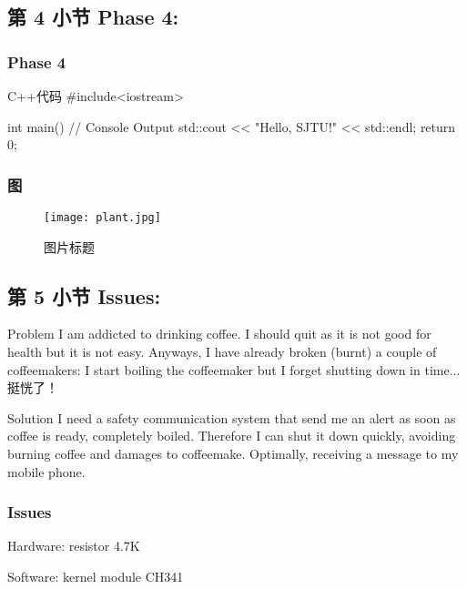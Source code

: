 \documentclass[
    aspectratio=169,                   %
]{beamer}
\begin{document}
\subsection{第 4 小节 Phase 4: }

    \begin{frame}[fragile]          %
        \frametitle{Phase 4}
        \begin{codeblock}[language=c++]{C++代码}
#include<iostream>

int main(){
    // Console Output
    std::cout << "Hello, SJTU!" << std::endl;
    return 0;
}
        \end{codeblock}
    \end{frame}

    \begin{frame}
        \frametitle{图}
        \begin{figure}
            \centering
            \begin{stampbox}
                \texttt{[image: plant.jpg]}
            \end{stampbox}
            \caption{图片标题\cite{viman}}
        \end{figure}
    \end{frame}

\subsection{第 5 小节 Issues: }

\begin{block}{Problem}
            I am addicted to drinking coffee. I should quit as it is not good for health but it is not easy. Anyways, I have already broken (burnt) a couple of coffeemakers: I start boiling the coffeemaker but I forget shutting down in time... 挺恍了！
        \end{block}

        \begin{block}{Solution}
            I need a safety communication system that send me an alert as soon as coffee is ready, completely boiled. Therefore I can shut it down quickly, avoiding burning coffee and damages to coffeemake. Optimally, receiving a message to my mobile phone.
        \end{block}

    \begin{frame}
        \frametitle{Issues}

        \begin{block}{Hardware: resistor 4.7K}

        \end{block}

        \begin{block}{Software: kernel module CH341}

        \end{block}

    \end{frame}
\end{document}
